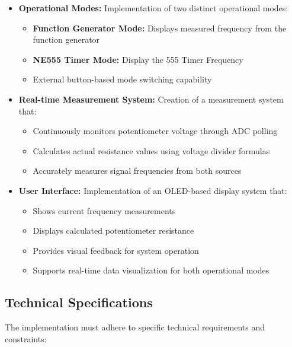 \begin{itemize}[leftmargin=2em]
    \item \textbf{Operational Modes:} Implementation of two distinct operational modes:
    \begin{itemize}
        \item \textbf{Function Generator Mode:} Displays measured frequency from the function generator
        \item \textbf{NE555 Timer Mode:} Display the 555 Timer Frequency
        \item External button-based mode switching capability
    \end{itemize}
    
    \item \textbf{Real-time Measurement System:} Creation of a measurement system that:
    \begin{itemize}
        \item Continuously monitors potentiometer voltage through ADC polling
        \item Calculates actual resistance values using voltage divider formulas
        \item Accurately measures signal frequencies from both sources
    \end{itemize}
    
    \item \textbf{User Interface:} Implementation of an OLED-based display system that:
    \begin{itemize}
        \item Shows current frequency measurements
        \item Displays calculated potentiometer resistance
        \item Provides visual feedback for system operation
        \item Supports real-time data visualization for both operational modes
    \end{itemize}
\end{itemize}

\subsection{Technical Specifications}
The implementation must adhere to specific technical requirements and constraints:


